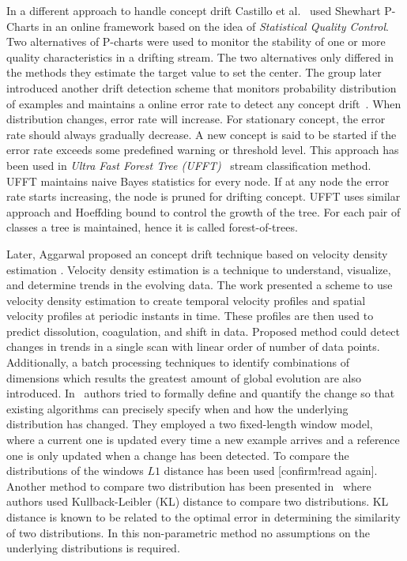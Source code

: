 In a different approach to handle concept drift Castillo et al.~\cite{gama03:drift} used Shewhart P-Charts in an online framework based on the idea of \textit{Statistical Quality Control}. Two alternatives of P-charts were used to monitor the stability of one or more quality characteristics in a drifting stream. The two alternatives only differed in the methods they estimate the target value to set the center. The group later introduced another drift detection scheme that monitors probability distribution of examples and maintains a online error rate to detect any concept drift~\cite{gama04:drift}. When distribution changes, error rate will increase. For stationary concept, the error rate should always gradually decrease. A new concept is said to be started if the error rate exceeds some predefined warning or threshold level. This approach has been used in \textit{Ultra Fast Forest Tree (UFFT)}~\cite{gama04:ft, gama05:ft} stream classification method. UFFT maintains naive Bayes statistics for every node. If at any node the error rate starts increasing, the node is pruned for drifting concept. UFFT uses similar approach and Hoeffding bound to control the growth of the tree. For each pair of classes a tree is maintained, hence it is called forest-of-trees.

Later, Aggarwal proposed an concept drift technique based on velocity density estimation \cite{aggarwal03:condrift}. Velocity density estimation is a technique to understand, visualize, and determine trends in the evolving data. The work presented a scheme to use velocity density estimation to create temporal velocity profiles and spatial velocity profiles at periodic instants in time. These profiles are then used to predict dissolution, coagulation, and shift in data. Proposed method could detect changes in trends in a single scan with linear order of number of data points. Additionally, a batch processing techniques to identify combinations of dimensions which results the greatest amount of global evolution are also introduced. In~\cite{kifer04:condrift} authors tried to formally define and quantify the change so that existing algorithms can precisely specify when and how the underlying distribution has changed. They employed a two fixed-length window model, where a current one is updated every time a new example arrives and a reference one is only updated when a change has been detected. To compare the distributions of the windows $L1$ distance has been used [confirm!read again]. Another method to compare two distribution has been presented in~\cite{dasu05:condrift} where authors used Kullback-Leibler (KL) distance to compare two distributions. KL distance is known to be related to the optimal error in determining the similarity of two distributions. In this non-parametric method no assumptions on the underlying distributions is required. 


